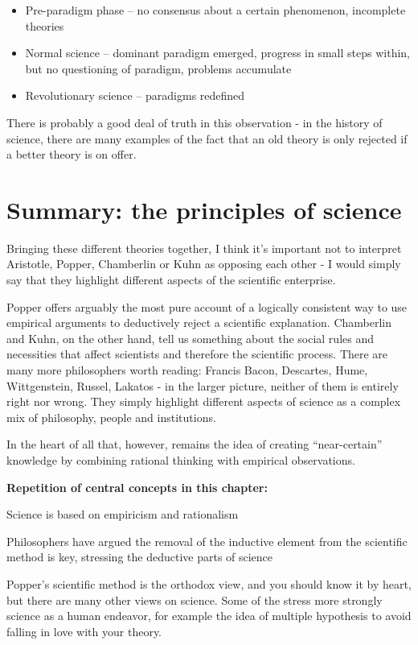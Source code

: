 \documentclass{tufte-book}
\begin{document}
\begin{itemize}
\item Pre-paradigm phase – no consensus about a certain phenomenon, incomplete theories
\item Normal science – dominant paradigm emerged, progress in small steps within, but no questioning of paradigm, problems accumulate
\item Revolutionary science – paradigms redefined
\end{itemize}

There is probably a good deal of truth in this observation - in the history of science, there are many examples of the fact that an old theory is only rejected if a better theory is on offer. 

\section{Summary: the principles of science}

Bringing these different theories together, I think it's important not to interpret Aristotle, Popper, Chamberlin or Kuhn as opposing each other - I would simply say that they highlight different aspects of the scientific enterprise. 

Popper offers arguably the most pure account of a logically consistent way to use empirical arguments to deductively reject a scientific explanation. Chamberlin and Kuhn, on the other hand, tell us something about the social rules and necessities that affect scientists and therefore the scientific process. There are many more philosophers worth reading: Francis Bacon, Descartes, Hume, Wittgenstein, Russel, Lakatos - in the larger picture, neither of them is entirely right nor wrong. They simply highlight different aspects of science as a complex mix of philosophy, people and institutions. 

In the heart of all that, however, remains the idea of creating ``near-certain'' knowledge by combining rational thinking with empirical observations.

\vspace{1cm}
\begin{mdframed}
    
\textbf{Repetition of central concepts in this chapter:} 

\begin{itemize*}
  \item Science is based on empiricism and rationalism
  \item Philosophers have argued the removal of the inductive element from the scientific method is key, stressing the deductive parts of science
  \item Popper's scientific method is the orthodox view, and you should know it by heart, but there are many other views on science. Some of the stress more strongly science as a human endeavor, for example the idea of multiple hypothesis to avoid falling in love with your theory. 
\end{itemize*}

\end{mdframed}
\end{document}
